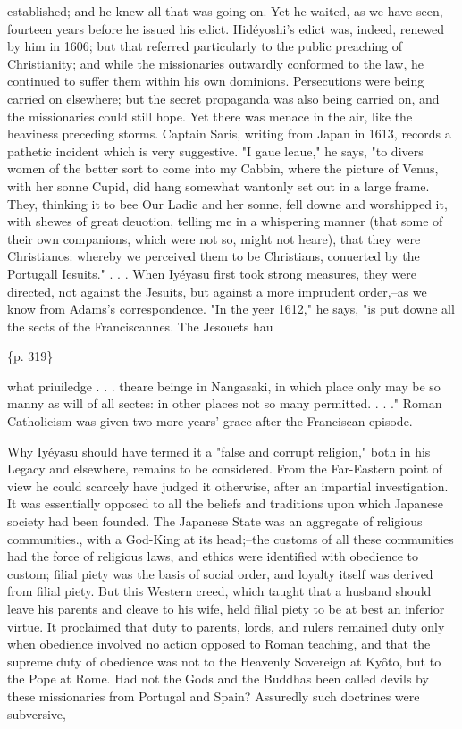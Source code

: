 established; and he knew all that was going on. Yet he waited, as we have seen, fourteen years before he issued his edict. Hidéyoshi's edict was, indeed, renewed by him in 1606; but that referred particularly to the public preaching of Christianity; and while the missionaries outwardly conformed to the law, he continued to suffer them within his own dominions. Persecutions were being carried on elsewhere; but the secret propaganda was also being carried on, and the missionaries could still hope. Yet there was menace in the air, like the heaviness preceding storms. Captain Saris, writing from Japan in 1613, records a pathetic incident which is very suggestive. "I gaue leaue," he says, "to divers women of the better sort to come into my Cabbin, where the picture of Venus, with her sonne Cupid, did hang somewhat wantonly set out in a large frame. They, thinking it to bee Our Ladie and her sonne, fell downe and worshipped it, with shewes of great deuotion, telling me in a whispering manner (that some of their own companions, which were not so, might not heare), that they were Christianos: whereby we perceived them to be Christians, conuerted by the Portugall Iesuits." . . . When Iyéyasu first took strong measures, they were directed, not against the Jesuits, but against a more imprudent order,--as we know from Adams's correspondence. "In the yeer 1612," he says, "is put downe all the sects of the Franciscannes. The Jesouets hau

\{p. 319\}

what priuiledge . . . theare beinge in Nangasaki, in which place only may be so manny as will of all sectes: in other places not so many permitted. . . ." Roman Catholicism was given two more years' grace after the Franciscan episode.

Why Iyéyasu should have termed it a "false and corrupt religion," both in his Legacy and elsewhere, remains to be considered. From the Far-Eastern point of view he could scarcely have judged it otherwise, after an impartial investigation. It was essentially opposed to all the beliefs and traditions upon which Japanese society had been founded. The Japanese State was an aggregate of religious communities., with a God-King at its head;--the customs of all these communities had the force of religious laws, and ethics were identified with obedience to custom; filial piety was the basis of social order, and loyalty itself was derived from filial piety. But this Western creed, which taught that a husband should leave his parents and cleave to his wife, held filial piety to be at best an inferior virtue. It proclaimed that duty to parents, lords, and rulers remained duty only when obedience involved no action opposed to Roman teaching, and that the supreme duty of obedience was not to the Heavenly Sovereign at Kyôto, but to the Pope at Rome. Had not the Gods and the Buddhas been called devils by these missionaries from Portugal and Spain? Assuredly such doctrines were subversive,


